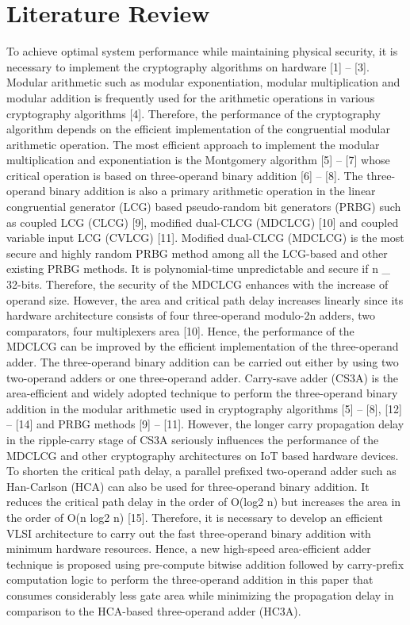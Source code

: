 \section[Literature Review]{\textbf{Literature Review}}

To achieve optimal system performance while maintaining physical security, it is necessary to implement the cryptography algorithms on hardware [1] – [3]. Modular arithmetic such as modular exponentiation, modular multiplication and modular addition is frequently used for the arithmetic operations in various cryptography algorithms [4]. Therefore, the performance of the cryptography algorithm depends on the efficient implementation of the congruential modular arithmetic operation. The most efficient approach to implement the modular multiplication and exponentiation is the Montgomery algorithm [5] – [7] whose critical operation is based on three-operand binary addition [6] – [8]. The three-operand binary addition is also a primary arithmetic operation in the linear congruential generator (LCG) based pseudo-random bit generators (PRBG) such as coupled LCG (CLCG) [9], modified dual-CLCG (MDCLCG) [10] and coupled variable input LCG (CVLCG) [11]. Modified dual-CLCG (MDCLCG) is the most secure and highly random PRBG method among all the LCG-based and other existing PRBG methods. It is polynomial-time unpredictable and secure if n \_ 32-bits. Therefore, the security of the MDCLCG enhances with the increase of operand size. However, the area and critical path delay increases linearly since its hardware architecture consists of four three-operand modulo-2n adders, two comparators, four multiplexers area [10]. Hence, the performance of the MDCLCG can be improved by the efficient implementation of the three-operand adder. The three-operand binary addition can be carried out either by using two two-operand adders or one three-operand adder. Carry-save adder (CS3A) is the area-efficient and widely adopted technique to perform the three-operand binary addition in the modular arithmetic used in cryptography algorithms [5] – [8], [12] – [14] and PRBG methods [9] – [11]. However, the longer carry propagation delay in the ripple-carry stage of CS3A seriously influences the performance of the MDCLCG and other cryptography architectures on IoT based hardware devices. To shorten the critical path delay, a parallel prefixed two-operand adder such as Han-Carlson (HCA) can also be used for three-operand binary addition. It reduces the critical path delay in the order of O(log2 n) but increases the area in the order of O(n log2 n) [15]. Therefore, it is necessary to develop an efficient VLSI architecture to carry out the fast three-operand binary addition with minimum hardware resources. Hence, a new high-speed area-efficient adder technique is proposed using pre-compute bitwise addition followed by carry-prefix computation logic to perform the three-operand addition in this paper that consumes considerably less gate area while minimizing the propagation delay in comparison to the HCA-based three-operand adder (HC3A). 



